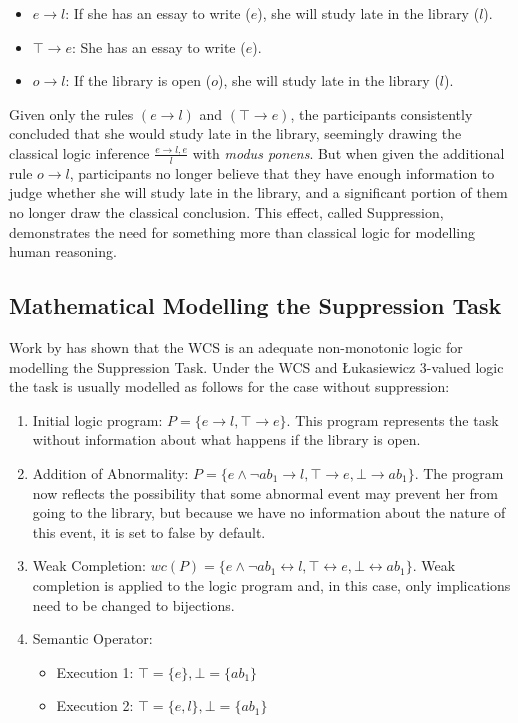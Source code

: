 \documentclass[
11pt, %
english, %
singlespacing, %
headsepline, %
]{MastersDoctoralThesis} %
\begin{document}
\begin{itemize}
\item $e \rightarrow l$: If she has an essay to write ($e$), she will study late in the library ($l$).
\item $\top \rightarrow e$: She has an essay to write ($e$).
\item $o\rightarrow l$: If the library is open ($o$), she will study late in the library ($l$).
\end{itemize}

Given only the rules $(e \rightarrow l)$ and $(\top \rightarrow e)$, the participants consistently concluded that she would study late in the library, seemingly drawing the classical logic inference $\frac{e \rightarrow l, e}{l}$ with \textit{modus ponens}. But when given the additional rule $o\rightarrow l$, participants no longer believe that they have enough information to judge whether she will study late in the library, and a significant portion of them no longer draw the classical conclusion. This effect, called Suppression, demonstrates the need for something more than classical logic for modelling human reasoning.

\subsection{Mathematical Modelling the Suppression Task} \label{ssec:sup_mod}
Work by \cite{dietz2014modeling} has shown that the WCS is an adequate non-monotonic logic for modelling the Suppression Task. Under the WCS and \L ukasiewicz 3-valued logic the task is usually modelled as follows for the case without suppression:
\begin{enumerate}
\item Initial logic program: $P = \{e \rightarrow l, \top \rightarrow e \}$. This program represents the task without information about what happens if the library is open.
\item Addition of Abnormality: $P = \{e \land \lnot ab_1 \rightarrow l, \top \rightarrow e, \bot \rightarrow ab_1 \}$. The program now reflects the possibility that some abnormal event may prevent her from going to the library, but because we have no information about the nature of this event, it is set to false by default.
\item Weak Completion: $wc(P) = \{e \land \lnot ab_1 \leftrightarrow l, \top \leftrightarrow e, \bot \leftrightarrow ab_1 \}$. Weak completion is applied to the logic program and, in this case, only implications need to be changed to bijections.
\item Semantic Operator:
\begin{itemize}
\item Execution 1: $\top=\{e\}, \bot=\{ab_1\}$
\item Execution 2: $\top=\{e,l\}, \bot=\{ab_1\}$
\end{itemize}
\end{enumerate}
\end{document}
